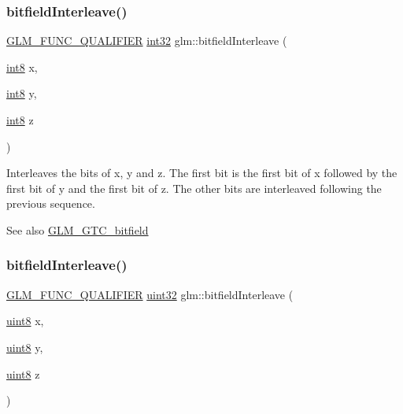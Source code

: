 \subsubsection{\texorpdfstring{bitfield\+Interleave()}{bitfieldInterleave()}\hspace{0.1cm}{\footnotesize\ttfamily [7/16]}}
{\footnotesize\ttfamily \hyperlink{setup_8hpp_a33fdea6f91c5f834105f7415e2a64407}{G\+L\+M\+\_\+\+F\+U\+N\+C\+\_\+\+Q\+U\+A\+L\+I\+F\+I\+ER} \hyperlink{group__gtc__type__precision_ga632d8b25f6b61659f39ea4321fab92a4}{int32} glm\+::bitfield\+Interleave (\begin{DoxyParamCaption}\item[{\hyperlink{group__gtc__type__precision_ga96254f9c1c4506fc8eb5cf3301ce8565}{int8}}]{x,  }\item[{\hyperlink{group__gtc__type__precision_ga96254f9c1c4506fc8eb5cf3301ce8565}{int8}}]{y,  }\item[{\hyperlink{group__gtc__type__precision_ga96254f9c1c4506fc8eb5cf3301ce8565}{int8}}]{z }\end{DoxyParamCaption})}

Interleaves the bits of x, y and z. The first bit is the first bit of x followed by the first bit of y and the first bit of z. The other bits are interleaved following the previous sequence.

\begin{DoxySeeAlso}{See also}
\hyperlink{group__gtc__bitfield}{G\+L\+M\+\_\+\+G\+T\+C\+\_\+bitfield} 
\end{DoxySeeAlso}
\mbox{\label{group__gtc__bitfield_gab9d593a2e916beb8f8137a0dbeae3afe}} 
\subsubsection{\texorpdfstring{bitfield\+Interleave()}{bitfieldInterleave()}\hspace{0.1cm}{\footnotesize\ttfamily [8/16]}}
{\footnotesize\ttfamily \hyperlink{setup_8hpp_a33fdea6f91c5f834105f7415e2a64407}{G\+L\+M\+\_\+\+F\+U\+N\+C\+\_\+\+Q\+U\+A\+L\+I\+F\+I\+ER} \hyperlink{group__gtc__type__precision_ga202b6a53c105fcb7e531f9b443518451}{uint32} glm\+::bitfield\+Interleave (\begin{DoxyParamCaption}\item[{\hyperlink{group__gtc__type__precision_ga1a7dcd8aac97cc8020817c94049deff2}{uint8}}]{x,  }\item[{\hyperlink{group__gtc__type__precision_ga1a7dcd8aac97cc8020817c94049deff2}{uint8}}]{y,  }\item[{\hyperlink{group__gtc__type__precision_ga1a7dcd8aac97cc8020817c94049deff2}{uint8}}]{z }\end{DoxyParamCaption})}

